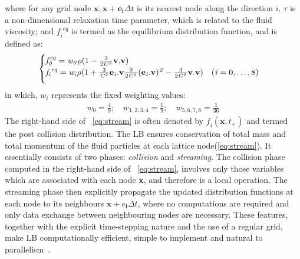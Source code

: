 where for any grid node $\mathbf{x},\mathbf{x}+\mathbf{e_i} \Delta t$ is its nearest node along the direction $\mathit{i}$. $\tau$ is a non-dimensional relaxation time parameter, which is related to the fluid viscosity; and $\mathit{f_i}^{\mathit{eq}}$ is termed as the equilibrium distribution function, and is defined as:
\begin{align}
\begin{cases}
\mathit{f}_{\mathit{0}}^{\mathit{eq}}=\mathit{w}_{\mathit{0}} \rho (1 - \frac{3}{2\mathit{C}^{\mathit{2}}}\mathbf{v}.\mathbf{v}) \\ 
\vspace*{2mm}
\mathit{f_i}^{\mathit{eq}}=\mathit{w_i} \rho (1 + \frac{3}{\mathit{C}^{\mathit{2}}}\mathbf{e}_{\mathit{i}}.\mathbf{v} \frac{9}{2\mathit{C}^{\mathit{2}}} (\mathbf{e}_{\mathit{i}}.\mathbf{v})^{\mathit{2}}-\frac{3}{2 \mathit{C}^{\mathit{2}}}\mathbf{v}.\mathbf{v}) \quad (\mathit{i}=0,\dots,8)
\end{cases}
\end{align}
in which, $\mathit{w_i}$ represents the fixed weighting values:
\begin{align}
\mathit{w}_{\mathit{0}} = \frac{4}{9}; \quad \mathit{w}_{\mathit{1,2,3,4}}= \frac{1}{9}; \quad \mathit{w}_{\mathit{5,6,7,8}}= \frac{1}{36}
\end{align}
The right-hand side of ~\cref{eq:stream} is often denoted by $\mathit{f_i}(\mathbf{x}, \mathit{t}_{+})$ and termed the post collision distribution. The LB ensures conservation of total mass and total momentum of the fluid particles at each lattice node(\cref{eq:stream}). It essentially consists of two phases: \textit{collision} and \textit{streaming}. The collision phase computed in the right-hand side of ~\cref{eq:stream}, involves only those variables which are associated with each node \textbf{x}, and therefore is a local operation. The streaming phase then explicitly propagate the updated distribution functions at each node to its neighbours $\mathbf{x}+\mathbf{\mathit{e}_i} \Delta t$, where no computations are required and only data exchange between neighbouring nodes are necessary. These features, together with the explicit time-stepping nature and the use of a regular grid, make LB computationally efficient, simple to implement and natural to parallelism~\citep{Han2007}. 

